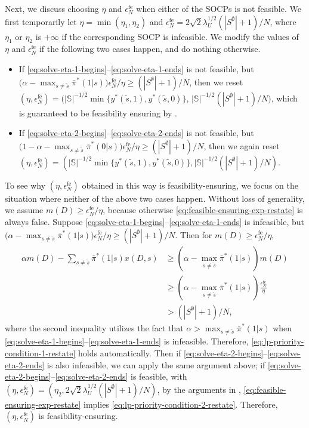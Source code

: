 \documentclass[11pt,letterpaper]{article}
\theoremstyle{plain}
\theoremstyle{definition}
\theoremstyle{remark}
\newcommand{\sspa}{\mathbb{S}}
\newcommand{\pibar}{{\sysbar{\pi}}}
\newcommand{\pibs}{{\pibar^*}}
\newcommand{\sysbar}[1]{\bar{#1}}
\newcommand{\sempty}{S^{\emptyset}}
\newcommand{\umat}{U}
\newcommand{\errfe}{\epsilon_N^{\text{fe}}}
\newcommand{\lamu}{\lambda_\umat}
\newcommand{\sneu}{\tilde{s}}
\begin{document}
Next, we discuss choosing $\eta$ and $\errfe$ when either of the SOCPs is not feasible. We first temporarily let $\eta = \min(\eta_1, \eta_2)$ and $\errfe = 2\sqrt{2} \lamu^{1/2} (|\sempty|+1) / N$, where $\eta_1$ or $\eta_2$ is $+\infty$ if the corresponding SOCP is infeasible. We modify the values of $\eta$ and $\errfe$ if the following two cases happen, and do nothing otherwise.
\begin{itemize}
\item If \eqref{eq:solve-eta-1-begins}--\eqref{eq:solve-eta-1-ends} is not feasible, but $\big(\alpha - \max_{s\neq \sneu} \pibs(1|s)\big) \errfe / \eta \geq (|\sempty|+1) / N$, then we reset $(\eta, \errfe) = \big(|\sspa|^{-1/2} \min\{y^*(\sneu,1), y^*(\sneu,0)\}, \, |\sspa|^{-1/2}(|\sempty|+1) / N \big)$, which is guaranteed to be feasibility ensuring by . 
\item If \eqref{eq:solve-eta-2-begins}--\eqref{eq:solve-eta-2-ends} is not feasible, but $\big(1 - \alpha - \max_{s\neq \sneu} \pibs(0|s)\big) \errfe / \eta \geq (|\sempty|+1) / N$, then we again reset $(\eta, \errfe) = (|\sspa|^{-1/2} \min\{y^*(\sneu,1), y^*(\sneu,0)\}, |\sspa|^{-1/2}(|\sempty|+1) / N)$. 
\end{itemize}
To see why $(\eta, \errfe)$ obtained in this way is feasibility-ensuring, we focus on the situation where neither of the above two cases happen. Without loss of generality, we assume $m(D) \geq \errfe / \eta$, because otherwise \eqref{eq:feasible-ensuring-exp-restate} is always false. 
Suppose \eqref{eq:solve-eta-1-begins}--\eqref{eq:solve-eta-1-ends} is infeasible, but $\big(\alpha - \max_{s\neq \sneu} \pibs(1|s)\big) \errfe / \eta \geq (|\sempty|+1) / N$. Then for $m(D) \geq \errfe / \eta$, 
\begin{align*}
    \alpha m(D) - \sum_{s\neq \sneu} \pibs(1|s) x(D,s) &\geq (\alpha - \max_{s\neq \sneu} \pibs(1|s)) m(D) \\
    &\geq (\alpha - \max_{s\neq \sneu} \pibs(1|s)) \frac{\errfe}{\eta} \\
    &> (|\sempty|+1) / N,  
\end{align*}
where the second inequality utilizes the fact that $\alpha > \max_{s\neq \sneu} \pibs(1|s)$ when \eqref{eq:solve-eta-1-begins}--\eqref{eq:solve-eta-1-ends} is infeasible. Therefore, \eqref{eq:lp-priority-condition-1-restate} holds automatically. 
Then if \eqref{eq:solve-eta-2-begins}--\eqref{eq:solve-eta-2-ends} is also infeasible, we can apply the same argument above; if \eqref{eq:solve-eta-2-begins}--\eqref{eq:solve-eta-2-ends} is feasible, with $(\eta, \errfe) = (\eta_2, 2\sqrt{2} \lamu^{1/2} (|\sempty|+1) / N)$, by the arguments in , \eqref{eq:feasible-ensuring-exp-restate} implies \eqref{eq:lp-priority-condition-2-restate}. Therefore, $(\eta, \errfe)$ is feasibility-ensuring. 
\end{document}
